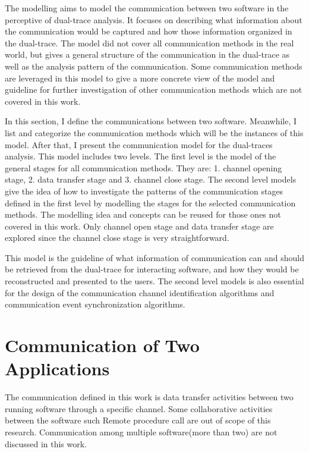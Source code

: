 

\label{chapter:Mod}
The modelling aims to model the communication between two software in the perceptive of dual-trace analysis. It focuses on describing what information about the communication would be captured and how those information organized in the dual-trace. The model did not cover all communication methods in the real world, but gives a general structure of the communication in the dual-trace as well as the analysis pattern of the communication. Some communication methods are leveraged in this model to give a more concrete view of the model and guideline for further investigation of other communication methods which are not covered in this work.

In this section, I define the communications between two software. Meanwhile, I list and categorize the communication methods which will be the instances of this model. After that, I present the communication model for the dual-traces analysis. This model includes two levels. The first level is the model of the general stages for all communication methods. They are: 1. channel opening stage, 2. data transfer stage and 3. channel close stage. The second level models give the idea of how to investigate the patterns of the communication stages defined in the first level by modelling the stages for the selected communication methods. The modelling idea and concepts can be reused for those ones not covered in this work. Only channel open stage and data transfer stage are explored since the channel close stage is very straightforward.

This model is the guideline of what information of communication can and should be retrieved from the dual-trace for interacting software, and how they would be reconstructed and presented to the users. The second level models is also essential for the design of the communication channel identification algorithms and communication event synchronization algorithms.

\section{Communication of Two Applications}   
The communication defined in this work is data transfer activities between two running software through a specific channel. Some collaborative activities between the software such Remote procedure call are out of scope of this research. Communication among multiple software(more than two) are not discussed in this work.

